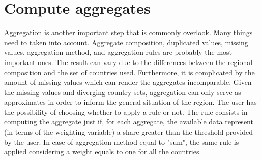 \documentclass[nojss]{jss}\usepackage[]{graphicx}\usepackage[]{color}
\begin{document}
\section{Compute aggregates}
Aggregation is another important step that is commonly overlook. Many things need to taken into account. Aggregate composition, duplicated values, missing values, aggregation method, and aggregation rules are probably the most important ones. The result can vary due to the differences between the regional composition and the set of countries used. Furthermore, it is complicated by the amount of missing values which can render the aggregates incomparable. Given the missing values and diverging country sets, aggregation can only serve as approximates in order to inform the general situation of the region. The user has the possibility of choosing whether to apply a rule or not. The rule consists in computing the aggregate just if, for each aggregate, the available data represent (in terms of the weighting variable) a share greater than the threshold provided by the user. In case of aggregation method equal to "sum", the same rule is applied considering a weight equals to one for all the countries. 

\end{document}
